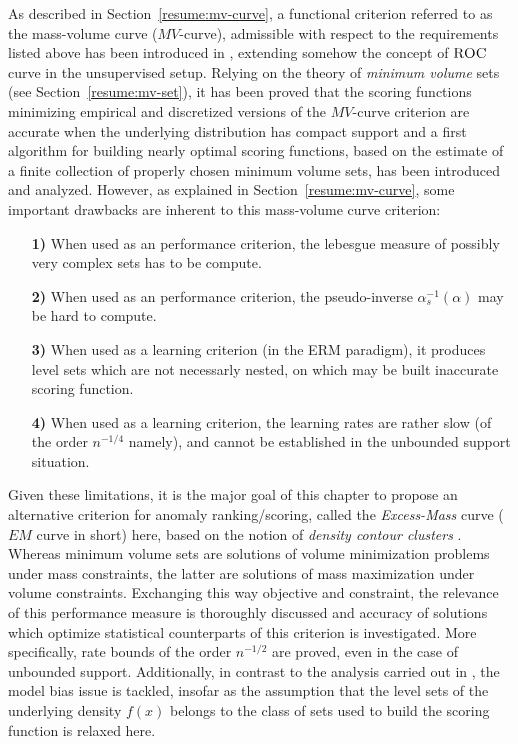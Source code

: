 As described in Section~\ref{resume:mv-curve}, a functional criterion referred to as the mass-volume curve ($MV$-curve), admissible with respect to the requirements listed above has been introduced in \cite{CLEM13}, extending somehow the concept of $\textsc{ROC}$ curve in the unsupervised setup. Relying on the theory of \textit{minimum volume} sets (see Section~\ref{resume:mv-set}), it has been proved that the scoring functions minimizing empirical and discretized versions of the $MV$-curve criterion are accurate when the underlying distribution has compact support and a first algorithm for building nearly optimal scoring functions, based on the estimate of a finite collection of properly chosen minimum volume sets, has been introduced and analyzed. 
However, as explained in Section~\ref{resume:mv-curve}, some important drawbacks are inherent to this mass-volume curve criterion:
\begin{itemize}
\item[\textbf{1)}] When used as an performance criterion, the lebesgue measure of possibly very complex sets has to be compute.
\item[\textbf{2)}] When used as an performance criterion, the pseudo-inverse $\alpha_s^{-1}(\alpha)$ may be hard to compute.
\item[\textbf{3)}] When used as a learning criterion (in the ERM paradigm), it produces level sets which are not necessarly nested, on which may be built inaccurate scoring function. 
\item[\textbf{4)}] When used as a learning criterion, the learning rates are rather slow (of the order $n^{-1/4}$ namely), and cannot be established in the unbounded support situation.
\end{itemize}
 Given these limitations, it is the major goal of this chapter to propose an alternative criterion for anomaly ranking/scoring, called the \textit{Excess-Mass} curve ($EM$ curve in short) here, based on the notion of {\it density contour clusters}  \cite{Polonik95,Hartigan1987,Muller1991}. Whereas minimum volume sets are solutions of volume minimization problems under mass constraints, the latter are solutions of mass maximization under volume constraints. Exchanging this way objective and constraint, the relevance of this performance measure is thoroughly discussed and accuracy of solutions which optimize statistical counterparts of this criterion is
investigated. More specifically, rate bounds of the order $n^{-1/2}$ are proved, even in the case of unbounded support. Additionally, in contrast to the analysis carried out in \cite{CLEM13}, the model bias issue is tackled,
insofar as the assumption that the level sets of the underlying
density $f(x)$ belongs to the class of sets used to build the scoring
function is relaxed here. 

